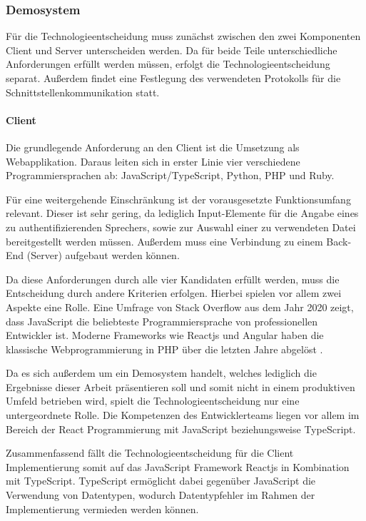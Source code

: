 \subsubsection{Demosystem}
Für die Technologieentscheidung muss zunächst zwischen den zwei Komponenten Client und Server unterscheiden werden.
Da für beide Teile unterschiedliche Anforderungen erfüllt werden müssen, erfolgt die Technologieentscheidung separat.
Außerdem findet eine Festlegung des verwendeten Protokolls für die Schnittstellenkommunikation statt.

\paragraph{Client}
Die grundlegende Anforderung an den Client ist die Umsetzung als Webapplikation.
Daraus leiten sich in erster Linie vier verschiedene Programmiersprachen ab: JavaScript/Type\-Script, Python, PHP und Ruby.

Für eine weitergehende Einschränkung ist der vorausgesetzte Funktionsumfang relevant.
Dieser ist sehr gering, da lediglich Input-Elemente für die Angabe eines zu authentifizierenden Sprechers, sowie zur Auswahl einer zu verwendeten Datei bereitgestellt werden müssen.
Außerdem muss eine Verbindung zu einem Back-End (Server) aufgebaut werden können.

Da diese Anforderungen durch alle vier Kandidaten erfüllt werden, muss die Entscheidung durch andere Kriterien erfolgen.
Hierbei spielen vor allem zwei Aspekte eine Rolle.
Eine Umfrage von Stack Overflow aus dem Jahr 2020 zeigt, dass JavaScript die beliebteste Programmiersprache von professionellen Entwickler ist.
Moderne Frameworks wie Reactjs und Angular haben die klassische Webprogrammierung in PHP über die letzten Jahre abgelöst \autocite[vgl.][]{stack_overflow_stack_nodate}.

Da es sich außerdem um ein Demosystem handelt, welches lediglich die Ergebnisse dieser Arbeit präsentieren soll und somit nicht in einem produktiven Umfeld betrieben wird, spielt die Technologieentscheidung nur eine untergeordnete Rolle.
Die Kompetenzen des Entwicklerteams liegen vor allem im Bereich der React Programmierung mit JavaScript beziehungsweise TypeScript.

Zusammenfassend fällt die Technologieentscheidung für die Client Implementierung somit auf das JavaScript Framework Reactjs in Kombination mit TypeScript.
TypeScript ermöglicht dabei gegenüber JavaScript die Verwendung von Datentypen, wodurch Datentypfehler im Rahmen der Implementierung vermieden werden können.

